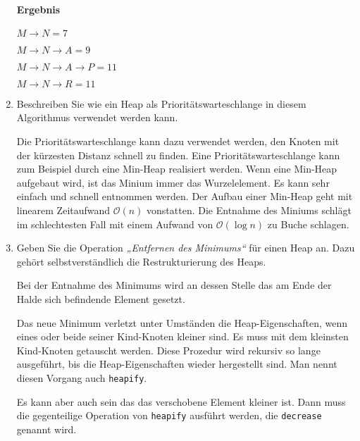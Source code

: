 \documentclass{lehramt-informatik-aufgabe}
\begin{document}
\begin{enumerate}
\paragraph{Ergebnis}

$M \rightarrow N = 7$

$M \rightarrow N \rightarrow A = 9$

$M \rightarrow N \rightarrow A \rightarrow P = 11$

$M \rightarrow N \rightarrow R = 11$


\item Beschreiben Sie wie ein Heap als
Prioritätswarteschlange in diesem Algorithmus verwendet werden kann.

\begin{antwort}
Die Prioritätswarteschlange kann dazu verwendet werden, den Knoten mit
der kürzesten Distanz schnell zu finden. Eine Prioritätswarteschlange
kann zum Beispiel durch eine Min-Heap realisiert werden. Wenn eine
Min-Heap aufgebaut wird, ist das Minium immer das Wurzelelement. Es kann
sehr einfach und schnell entnommen werden. Der Aufbau einer Min-Heap
geht mit linearem Zeitaufwand $\mathcal{O}(n)$ vonstatten. Die
Entnahme des Miniums schlägt im schlechtesten Fall mit einem Aufwand
von $\mathcal{O}(\log n)$ zu Buche schlagen.
\end{antwort}


\item Geben Sie die Operation \emph{„Entfernen des Minimums“} für einen
Heap an. Dazu gehört selbstverständlich die Restrukturierung des Heaps.

\begin{antwort}
Bei der Entnahme des Minimums wird an dessen Stelle das am Ende
der Halde sich befindende Element gesetzt.

Das neue Minimum verletzt unter Umständen die Heap-Eigenschaften, wenn
eines oder beide seiner Kind-Knoten kleiner sind. Es muss mit dem
kleinsten Kind-Knoten getauscht werden. Diese Prozedur wird rekursiv so
lange ausgeführt, bis die Heap-Eigenschaften wieder hergestellt sind.
Man nennt diesen Vorgang auch \texttt{heapify}.

Es kann aber auch sein das das verschobene Element kleiner ist. Dann
muss die gegenteilige Operation von \texttt{heapify} ausführt werden,
die \texttt{decrease} genannt wird.
\end{antwort}
\end{enumerate}
\end{document}
